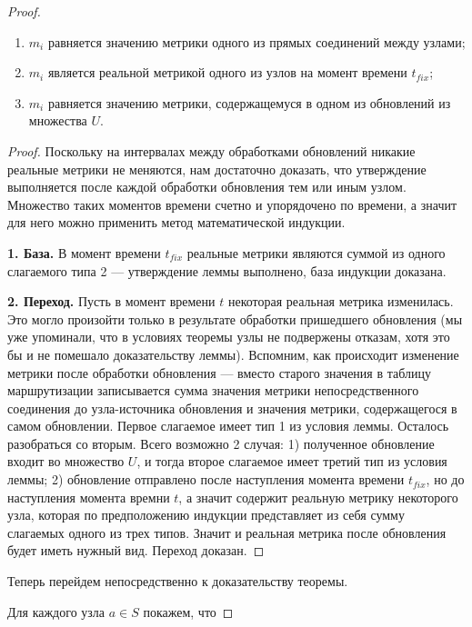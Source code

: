 \begin{proof}
\begin{lemma}
        \begin{enumerate}
            \item $m_i$ равняется значению метрики одного из прямых соединений между узлами;
            \item $m_i$ является реальной метрикой одного из узлов на момент времени $t_{fix}$;
            \item $m_i$ равняется значению метрики, содержащемуся в одном из обновлений из множества $U$.
        \end{enumerate}
    \end{lemma}
    \begin{proof}
        Поскольку на интервалах между обработками обновлений никакие реальные метрики не меняются, нам достаточно доказать, что утверждение выполняется после каждой обработки обновления тем или иным узлом. Множество таких моментов времени счетно и упорядочено по времени, а значит для него можно применить метод математической индукции.
        
        \textbf{1. База.} В момент времени $t_{fix}$ реальные метрики являются суммой из одного слагаемого типа 2 --- утверждение леммы выполнено, база индукции доказана.
        
        \textbf{2. Переход. } Пусть в момент времени $t$ некоторая реальная метрика изменилась. Это могло произойти только в результате обработки пришедшего обновления (мы уже упоминали, что в условиях теоремы узлы не подвержены отказам, хотя это бы и не помешало доказательству леммы). Вспомним, как происходит изменение метрики после обработки обновления --- вместо старого значения в таблицу маршрутизации записывается сумма значения метрики непосредственного соединения до узла-источника обновления и значения метрики, содержащегося в самом обновлении. Первое слагаемое имеет тип 1 из условия леммы. Осталось разобраться со вторым. Всего возможно 2 случая: 1) полученное обновление входит во множество $U$, и тогда второе слагаемое имеет третий тип из условия леммы; 2) обновление отправлено после наступления момента времени $t_{fix}$, но до наступления момента времни $t$, а значит содержит реальную метрику некоторого узла, которая по предположению индукции представляет из себя сумму слагаемых одного из трех типов. Значит и реальная метрика после обновления будет иметь нужный вид. Переход доказан.
    \end{proof}
    
    Теперь перейдем непосредственно к доказательству теоремы.
    
    Для каждого узла $a \in S$ покажем, что
    

\end{proof}
